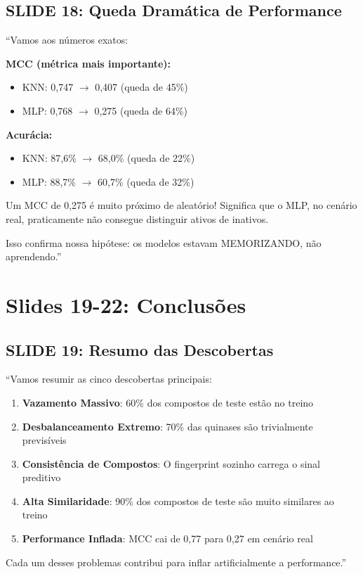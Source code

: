 \documentclass[11pt,a4paper]{article}
\begin{document}
\subsection{SLIDE 18: Queda Dramática de Performance}

\begin{oquedizer}
``Vamos aos números exatos:

\textbf{MCC (métrica mais importante):}
\begin{itemize}
    \item KNN: 0,747 $\rightarrow$ 0,407 (queda de 45\%)
    \item MLP: 0,768 $\rightarrow$ 0,275 (queda de 64\%)
\end{itemize}

\textbf{Acurácia:}
\begin{itemize}
    \item KNN: 87,6\% $\rightarrow$ 68,0\% (queda de 22\%)
    \item MLP: 88,7\% $\rightarrow$ 60,7\% (queda de 32\%)
\end{itemize}

Um MCC de 0,275 é muito próximo de aleatório! Significa que o MLP, no cenário real, praticamente não consegue distinguir ativos de inativos.

Isso confirma nossa hipótese: os modelos estavam MEMORIZANDO, não aprendendo.''
\end{oquedizer}

\section{Slides 19-22: Conclusões}

\subsection{SLIDE 19: Resumo das Descobertas}

\begin{oquedizer}
``Vamos resumir as cinco descobertas principais:

\begin{enumerate}
    \item \textbf{Vazamento Massivo}: 60\% dos compostos de teste estão no treino
    \item \textbf{Desbalanceamento Extremo}: 70\% das quinases são trivialmente previsíveis
    \item \textbf{Consistência de Compostos}: O fingerprint sozinho carrega o sinal preditivo
    \item \textbf{Alta Similaridade}: 90\% dos compostos de teste são muito similares ao treino
    \item \textbf{Performance Inflada}: MCC cai de 0,77 para 0,27 em cenário real
\end{enumerate}

Cada um desses problemas contribui para inflar artificialmente a performance.''
\end{oquedizer}
\end{document}
